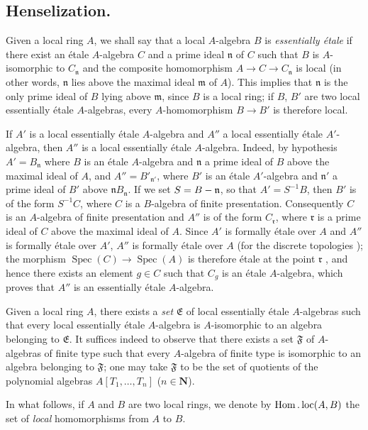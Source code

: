 \subsection{Henselization.}
\label{subsection:IV.18.6}

\begin{env}[18.6.1]
\label{IV.18.6.1}
Given a local ring $A$, we shall say that a local $A$-algebra $B$ is \emph{essentially \'etale} if there exist an \'etale $A$-algebra $C$ and a prime ideal $\mathfrak{n}$ of $C$ such that $B$ is $A$-isomorphic to $C_{\mathfrak{n}}$ and the composite homomorphism $A\to C\to C_{\mathfrak{n}}$ is local (in other words, $\mathfrak{n}$ lies above the maximal ideal $\mathfrak{m}$ of $A$).
This implies  that $\mathfrak{n}$ is the only prime ideal of $B$ lying above $\mathfrak{m}$, since $B$ is a local ring;
if $B$, $B'$ are two local essentially \'etale $A$-algebras, every $A$-homomorphism $B\to B'$ is therefore local.

If $A'$ is a local essentially \'etale $A$-algebra and $A''$ a local essentially \'etale $A'$-algebra, then $A''$ is a local essentially \'etale $A$-algebra.
Indeed, by hypothesis $A'=B_{\mathfrak n}$ where $B$ is an \'etale $A$-algebra and $\mathfrak{n}$ a prime ideal of $B$ above the maximal ideal of $A$, and $A''=B'_{\mathfrak{n}'}$, where $B'$ is an \'etale $A'$-algebra and $\mathfrak{n}'$ a prime ideal of $B'$ above $\mathfrak{n}B_{\mathfrak{n}}$.
If we set $S=B-\mathfrak{n}$, so that $A'=S^{-1}B$, then $B'$ is of the form $S^{-1}C$, where $C$ is a $B$-algebra of finite presentation.
Consequently $C$ is an $A$-algebra of finite presentation and $A''$ is of the form $C_{\mathfrak{r}}$, where $\mathfrak{r}$ is a prime ideal of $C$ above the maximal ideal of $A$.
Since $A'$ is formally \'etale over $A$ and $A''$ is formally \'etale over $A'$, $A''$ is formally \'etale over $A$ (for the discrete topologies );
the morphism $\operatorname{Spec}(C)\to\operatorname{Spec}(A)$ is therefore \'etale at the point $\mathfrak{r}$ , and hence there exists an element $g\in C$ such that $C_g$ is an \'etale $A$-algebra, which proves that $A''$ is an essentially \'etale $A$-algebra.

Given a local ring $A$, there exists a \emph{set} $\mathfrak{E}$ of local essentially \'etale $A$-algebras such that every local essentially \'etale $A$-algebra is $A$-isomorphic to an algebra belonging to $\mathfrak{E}$.
It suffices indeed to observe that there exists a set $\mathfrak{F}$ of $A$-algebras of finite type such that every $A$-algebra of finite type is isomorphic to an algebra belonging to $\mathfrak{F}$;
one may take $\mathfrak{F}$ to be the set of quotients of the polynomial algebras $A[T_1,\ldots,T_n]$ ($n\in\mathbf{N}$).

In what follows, if $A$ and $B$ are two local rings, we denote by $\operatorname{Hom}.\operatorname{loc}(A,B)$ the set of \emph{local} homomorphisms from $A$ to $B$.
\end{env}

